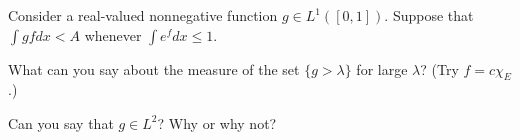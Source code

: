 Consider a real-valued nonnegative function $g\in L^1([0,1])$. Suppose
that $\int gf dx <A$ whenever $\int e^f dx \leq 1$.
\begin{alist}
\item What can you say about the measure of the set $\{g>\lambda\}$
for large $\lambda$? (Try $f=c \chi_E$.)
\item Can you say that $g\in L^2$? Why or why not?
\end{alist}

